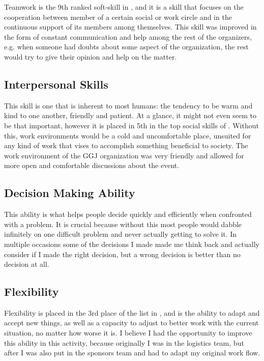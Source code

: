\documentclass[a4paper,12pt,journal,twoside,compsoc]{PPIEEEtran}
\begin{document}
Teamwork is the 9th ranked soft-skill in \cite{executive}, and it is a skill that focuses on the cooperation between member of a certain social or work circle and in the continuous support of its members among themselves. This skill was improved in the form of constant communication and help among the rest of the organizers, e.g. when someone had doubts about some aspect of the organization, the rest would try to give their opinion and help on the matter.

\subsection{Interpersonal Skills}

This skill is one that is inherent to most humans: the tendency to be warm and kind to one another, friendly and patient. At a glance, it might not even seem to be that important, however it is placed in 5th in the top social skills of \cite{executive}. Without this, work environments would be a cold and uncomfortable place, unsuited for any kind of work that vises to accomplish something beneficial to society. The work environment of the GGJ organization was very friendly and allowed for more open and comfortable discussions about the event.

\subsection{Decision Making Ability}

This ability is what helps people decide quickly and efficiently when confronted with a problem. It is crucial because without this most people would dabble infinitely on one difficult problem and never actually getting to solve it. In multiple occasions some of the decisions I made made me think back and actually consider if I made the right decision, but a wrong decision is better than no decision at all.

\subsection{Flexibility}

Flexibility is placed in the 3rd place of the list in \cite{executive}, and is the ability to adapt and accept new things, as well as a capacity to adjust to better work with the current situation, no matter how worse it is. I believe I had the opportunity to improve this ability in this activity, because originally I was in the logistics team, but after I was also put in the sponsors team and had to adapt my original work flow.
\end{document}
